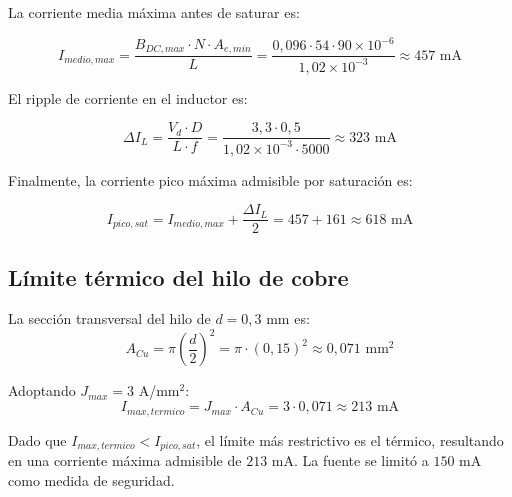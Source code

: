 La corriente media máxima antes de saturar es:

\begin{equation}
    I_{medio,max} = \frac{B_{DC,max} \cdot N \cdot A_{e,min}}{L} = \frac{0,096 \cdot 54 \cdot 90\times10^{-6}}{1,02\times10^{-3}} \approx 457\text{ mA}
    \label{eq:imediomaxsat}
\end{equation}

El ripple de corriente en el inductor es:

\begin{equation}
    \Delta I_L = \frac{V_d \cdot D}{L \cdot f} = \frac{3,3 \cdot 0,5}{1,02\times10^{-3} \cdot 5000} \approx 323\text{ mA}
    \label{eq:deltaIL}
\end{equation}

Finalmente, la corriente pico máxima admisible por saturación es:

\begin{equation}
    I_{pico,sat} = I_{medio,max} + \frac{\Delta I_L}{2} = 457 + 161 \approx 618\text{ mA}
    \label{eq:ipicosat}
\end{equation}

\subsection{Límite térmico del hilo de cobre}

La sección transversal del hilo de $d = 0,3$ mm es:
\begin{equation}
    A_{Cu} = \pi \left(\frac{d}{2}\right)^2 = \pi \cdot (0,15)^2 \approx 0,071 \text{ mm}^2
    \label{eq:seccion}
\end{equation}

Adoptando $J_{max} = 3$ A/mm$^2$:
\begin{equation}
    I_{max,termico} = J_{max} \cdot A_{Cu} = 3 \cdot 0,071 \approx 213 \text{ mA}
    \label{eq:itermico}
\end{equation}

Dado que $I_{max,termico} < I_{pico,sat}$, el límite más restrictivo es el térmico, resultando en una corriente máxima admisible de $213$ mA. La fuente se limitó a $150$ mA como medida de seguridad.
